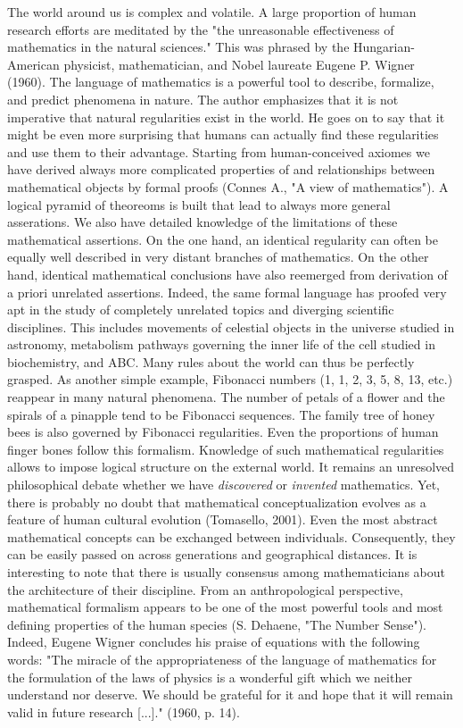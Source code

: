 \documentclass[authoryear,review,3p]{elsarticle}
\begin{document}
The world around us is complex and volatile.
%
A large proportion of human research efforts are meditated by the 
"the unreasonable effectiveness of mathematics in the natural sciences."
This was phrased by the Hungarian-American
physicist, mathematician, and Nobel laureate Eugene P. Wigner (1960).
The language of mathematics is a powerful tool to
describe, formalize, and predict phenomena in nature.
The author emphasizes that it is not imperative that
natural regularities exist in the world. He goes on to
say that it might be even more surprising that humans can actually
find these regularities and use them to their advantage.
%
Starting from human-conceived axiomes
we have derived always more complicated
properties of and relationships between mathematical objects by formal proofs
(Connes A., "A view of mathematics").
A logical pyramid of theoreoms is built that lead to always
more general asserations.
We also have detailed knowledge of the limitations of these mathematical
assertions.
%
On the one hand,
an identical regularity can often be equally well described in very distant
branches of mathematics.
On the other hand,
identical mathematical conclusions have also reemerged from derivation of
a priori unrelated assertions.
%
Indeed, the same formal language has proofed very apt in
the study of completely unrelated topics and diverging scientific disciplines.
This includes movements of celestial objects in the universe studied in astronomy,
metabolism pathways governing the inner life of the cell studied in biochemistry,
and
ABC.
%
Many rules about the world can thus be perfectly grasped.
As another simple example,
Fibonacci numbers (1, 1, 2, 3, 5, 8, 13, etc.)
reappear in many natural phenomena.
The number of petals of a flower and the spirals of a pinapple tend
to be Fibonacci sequences.
The family tree of honey bees is also governed by Fibonacci regularities.
Even the proportions of human finger bones follow this formalism.
Knowledge of such mathematical regularities
allows to impose logical structure on the external world.
%
It remains an unresolved philosophical debate whether we have
\textit{discovered} or \textit{invented} mathematics.
Yet, there is probably no doubt
that mathematical conceptualization
evolves as a feature of human cultural evolution (Tomasello, 2001).
Even the most abstract mathematical concepts can
be exchanged between individuals. Consequently,
they can be easily passed on across generations and geographical distances.
It is interesting to note that
there is usually consensus among mathematicians
about the architecture of their discipline.
From an anthropological perspective,
mathematical formalism
appears to be one of the most
powerful tools and most defining properties of the human species
(S. Dehaene, "The Number Sense").
Indeed,
Eugene Wigner concludes his praise of equations with the following words:
"The miracle of the appropriateness of the language of mathematics
for the formulation of the laws of physics is a wonderful gift
which we neither understand nor deserve. We should be grateful for
it and hope that it will remain valid in future research [...]."
(1960, p. 14).
\end{document}
